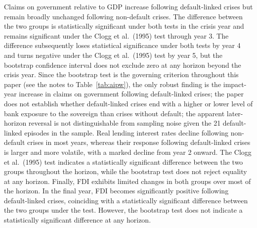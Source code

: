 \documentclass[12pt]{article}
\begin{document}
Claims on government relative to GDP increase following default-linked
crises but remain broadly unchanged following non-default crises. The
difference between the two groups is statistically significant under
both tests in the crisis year and remains significant under the Clogg et
al.\ (1995) test through year 3. The difference subsequently loses
statistical significance under both tests by year 4 and turns negative
under the Clogg et al.\ (1995) test by year 5, but the bootstrap
confidence interval does not exclude zero at any horizon beyond the
crisis year. Since the bootstrap test is the governing criterion
throughout this paper (see the notes to Table~\ref{tab:aipw}), the only
robust finding is the impact-year increase
in claims on government following default-linked crises; the paper does
not establish whether default-linked crises end with a higher or lower
level of bank exposure to the sovereign than crises without default; the
apparent later-horizon reversal is not distinguishable from sampling
noise given the 21 default-linked episodes in the sample. Real lending
interest rates decline following non-default crises in most years,
whereas their response following default-linked crises is larger and
more volatile, with a marked decline from year 2 onward. The Clogg et
al.\ (1995) test indicates a statistically significant difference between
the two groups throughout the horizon, while the bootstrap test does not
reject equality at any horizon. Finally, FDI exhibits limited changes in
both groups over most of the horizon. In the final year, FDI becomes
significantly positive following default-linked crises, coinciding with a
statistically significant difference between the two groups under the
\citet{clogg1995statistical} test. However, the bootstrap test does not indicate a
statistically significant difference at any horizon.
\end{document}
